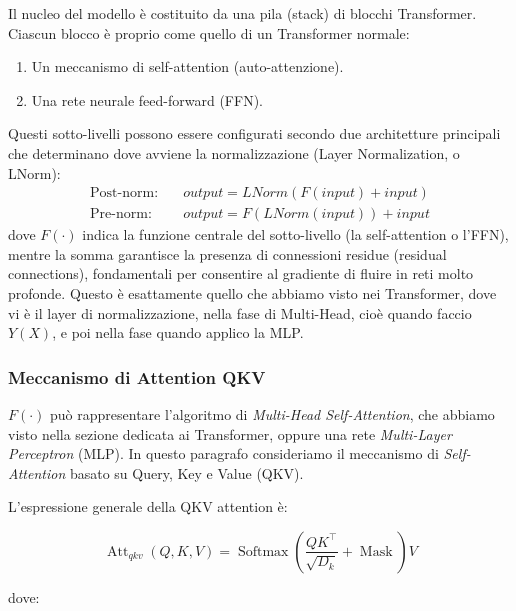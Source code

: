Il nucleo del modello è costituito da una pila (stack) di blocchi Transformer. Ciascun blocco è proprio come quello di un Transformer normale:
\begin{enumerate}
\item Un meccanismo di self-attention (auto-attenzione).
\item Una rete neurale feed-forward (FFN).
\end{enumerate}

Questi sotto-livelli possono essere configurati secondo due architetture principali che determinano dove avviene la normalizzazione (Layer Normalization, o LNorm):
\begin{align}
\text{Post-norm:} \quad & output = LNorm(F(input) + input) \\
\text{Pre-norm:} \quad & output = F(LNorm(input)) + input
\end{align}
dove $F(\cdot)$ indica la funzione centrale del sotto-livello (la self-attention o l'FFN), mentre la somma garantisce la presenza di connessioni residue (residual connections), fondamentali per consentire al gradiente di fluire in reti molto profonde.
Questo è esattamente quello che abbiamo visto nei Transformer, dove vi è il layer di normalizzazione, nella fase di Multi-Head, cioè quando faccio $Y(X)$, e poi nella fase quando applico la MLP.


\subsubsection{Meccanismo di Attention QKV}

$F(\cdot)$ può rappresentare l'algoritmo di \textit{Multi-Head Self-Attention}, che abbiamo visto nella sezione dedicata ai Transformer, oppure una rete \textit{Multi-Layer Perceptron} (MLP). In questo paragrafo consideriamo il meccanismo di \textit{Self-Attention} basato su Query, Key e Value (QKV).

L'espressione generale della QKV attention è:

\begin{equation}
\operatorname{Att}_{qkv}(Q,K,V)
=
\operatorname{Softmax}
\left(
\frac{QK^\top}{\sqrt{D_k}} + \operatorname{Mask}
\right)V
\end{equation}

dove:

